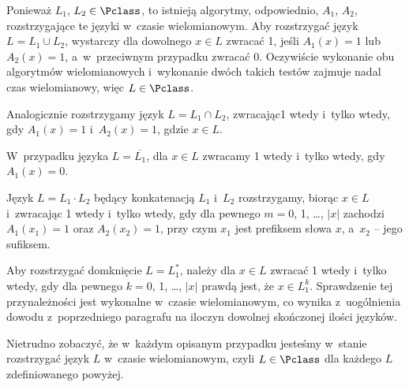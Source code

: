 \exercise %
Ponieważ $L_1$, $L_2\in\Pclass$, to istnieją algorytmy, odpowiednio, $A_1$, $A_2$, rozstrzygające te języki w~czasie wielomianowym.
Aby rozstrzygać język $L=L_1\cup L_2$, wystarczy dla dowolnego $x\in L$ zwracać 1, jeśli $A_1(x)=1$ lub $A_2(x)=1$, a~w~przeciwnym przypadku zwracać 0.
Oczywiście wykonanie obu algorytmów wielomianowych i~wykonanie dwóch takich testów zajmuje nadal czas wielomianowy, więc $L\in\Pclass$.

Analogicznie rozstrzygamy język $L=L_1\cap L_2$, zwracając1 wtedy i~tylko wtedy, gdy $A_1(x)=1$ i~$A_2(x)=1$, gdzie $x\in L$.

W~przypadku języka $L=\overline{L_1}$, dla $x\in L$ zwracamy 1 wtedy i~tylko wtedy, gdy $A_1(x)=0$.

Język $L=L_1\cdot L_2$ będący konkatenacją $L_1$ i~$L_2$ rozstrzygamy, biorąc $x\in L$ i~zwracając 1 wtedy i~tylko wtedy, gdy dla pewnego $m=0$, 1, \dots, $|x|$ zachodzi $A_1(x_1)=1$ oraz $A_2(x_2)=1$, przy czym $x_1$ jest  prefiksem słowa $x$, a~$x_2$ -- jego  sufiksem.

Aby rozstrzygać domknięcie $L=L_1^*$, należy dla $x\in L$ zwracać 1 wtedy i~tylko wtedy, gdy dla pewnego $k=0$, 1, \dots, $|x|$ prawdą jest, że $x\in L_1^k$.
Sprawdzenie tej przynależności jest wykonalne w~czasie wielomianowym, co wynika z~uogólnienia dowodu z~poprzedniego paragrafu na iloczyn dowolnej skończonej ilości języków.

Nietrudno zobaczyć, że w~każdym opisanym przypadku jesteśmy w~stanie rozstrzygać język $L$ w~czasie wielomianowym, czyli $L\in\Pclass$ dla każdego $L$ zdefiniowanego powyżej.
